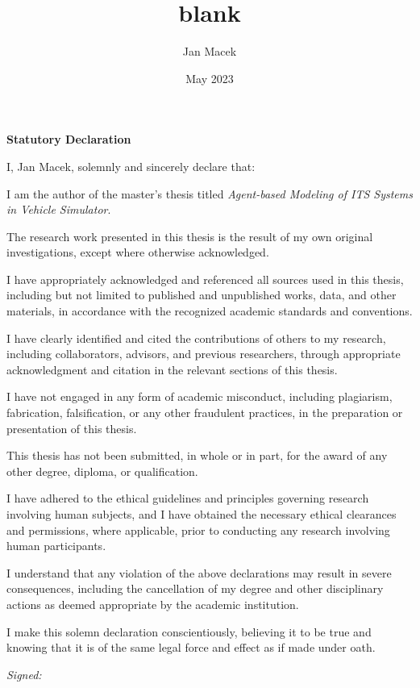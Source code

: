 \documentclass[12pt]{article}
\title{blank}
\author{Jan Macek}
\date{May 2023}
\begin{document}
\vspace*{\fill}

{\large\bfseries Statutory Declaration}\bigskip

I, Jan Macek, solemnly and sincerely declare that:

I am the author of the master's thesis titled \emph{Agent-based Modeling of ITS Systems in Vehicle
Simulator}.

The research work presented in this thesis is the result of my own original investigations,
except where otherwise acknowledged.

I have appropriately acknowledged and referenced all sources used in this thesis, including but
not limited to published and unpublished works, data, and other materials, in accordance with
the recognized academic standards and conventions.

I have clearly identified and cited the contributions of others to my research, including
collaborators, advisors, and previous researchers, through appropriate acknowledgment and
citation in the relevant sections of this thesis.

I have not engaged in any form of academic misconduct, including plagiarism, fabrication,
falsification, or any other fraudulent practices, in the preparation or presentation of this
thesis.

This thesis has not been submitted, in whole or in part, for the award of any other degree,
diploma, or qualification.

I have adhered to the ethical guidelines and principles governing research involving human
subjects, and I have obtained the necessary ethical clearances and permissions, where
applicable, prior to conducting any research involving human participants.

I understand that any violation of the above declarations may result in severe consequences,
including the cancellation of my degree and other disciplinary actions as deemed appropriate by
the academic institution.

I make this solemn declaration conscientiously, believing it to be true and knowing that it is
of the same legal force and effect as if made under oath.\bigskip

\hspace*{\fill}\emph{Signed:}\hspace{5cm}

\vspace{3cm}
\end{document}
